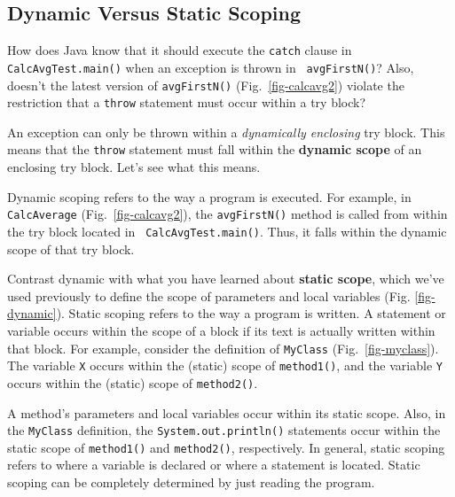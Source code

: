 

\subsection{Dynamic Versus Static Scoping}
\noindent How does Java know that it should execute the {\tt catch} clause in
{\tt CalcAvg\-Test.main()} when an exception is thrown in {\tt
avgFirstN()}?  Also, doesn't the latest version of {\tt avgFirstN()}
(Fig.~\ref{fig-calcavg2}) violate the restriction that a {\tt throw}
statement must occur within a try block?

An exception can only be thrown within a {\it dynamically enclosing}
try block.  This means that the {\tt throw} statement must fall within
the {\bf dynamic scope} of an enclosing try block.  Let's see what
this means.

Dynamic scoping refers to the way a program is executed.  For example,
in {\tt CalcAverage} (Fig.~\ref{fig-calcavg2}), the {\tt avgFirstN()}
method is called from within the try block located in {\tt
CalcAvgTest.main()}.  Thus, it falls within the dynamic scope of that
try block.

Contrast dynamic with what you have learned about {\bf static scope}, which
we've used previously to define the scope of parameters and local
variables (Fig. \ref{fig-dynamic}).  Static scoping refers to the
way a program is written.  A statement or variable occurs within the
scope of a block if its text is actually written within that block.
For example, consider the definition of {\tt MyClass}
(Fig.~\ref{fig-myclass}). The variable {\tt X} occurs within the
(static) scope of {\tt method1()}, and the variable {\tt Y} occurs
within the (static) scope of {\tt method2()}.
\begin{figure}[h]
\end{figure}


A method's parameters and local variables occur within its static
scope.  Also, in the {\tt MyClass} definition, the
{\tt System.out.println()} statements occur within the static scope of
{\tt method1()} and {\tt method2()}, respectively.   In general, static
scoping refers to where a variable is declared or where a statement is
located.  Static scoping can be completely determined by just reading
the program.


